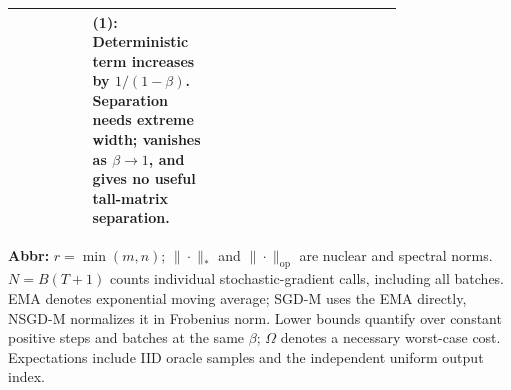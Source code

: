 \begin{table}[tp]
\begin{threeparttable}
\begin{tabularx}{\linewidth}{@{}>{\raggedright\arraybackslash}p{0.20\linewidth}>{\raggedright\arraybackslash}p{0.32\linewidth}>{\raggedright\arraybackslash}p{0.25\linewidth}>{\raggedright\arraybackslash}X@{}}
& \textbf{(1)}: Deterministic term increases by $1/(1-\beta)$. Separation needs extreme width; vanishes as $\beta\to1$, and gives no useful tall-matrix separation. \\
\bottomrule
\end{tabularx}
\begin{tablenotes}[flushleft]\footnotesize
\item[] \textbf{Abbr:} $r=\min(m,n)$; $\|\cdot\|_*$ and $\|\cdot\|_{\mathrm{op}}$ are nuclear and spectral norms. $N=B(T+1)$ counts individual stochastic-gradient calls, including all batches. EMA denotes exponential moving average; SGD-M uses the EMA directly, NSGD-M normalizes it in Frobenius norm. Lower bounds quantify over constant positive steps and batches at the same $\beta$; $\Omega$ denotes a necessary worst-case cost. Expectations include IID oracle samples and the independent uniform output index.
\end{tablenotes}
\end{threeparttable}
\end{table}
\clearpage
